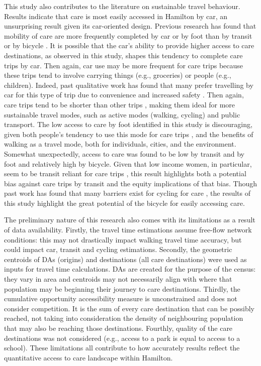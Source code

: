\documentclass[
  super,
  preprint,
  3p]{elsarticle}
\begin{document}
This study also contributes to the literature on sustainable travel
behaviour. Results indicate that care is most easily accessed in
Hamilton by car, an unsurprising result given its car-oriented design.
Previous research has found that mobility of care are more frequently
completed by car or by foot than by transit or by bicycle
\citep{ravensbergenExploratoryAnalysisMobility2022}. It is possible that
the car's ability to provide higher access to care destinations, as
observed in this study, shapes this tendency to complete care trips by
car. Then again, car use may be more frequent for care trips because
these trips tend to involve carrying things (e.g., groceries) or people
(e.g., children). Indeed, past qualitative work has found that many
prefer travelling by car for this type of trip due to convenience and
increased safety
\citep{maciejewskaHaveChildrenThus2019, carverParentalChauffeursWhat2013}.
Then again, care trips tend to be shorter than other trips
\citep{ravensbergenExploratoryAnalysisMobility2022}, making them ideal
for more sustainable travel modes, such as active modes (walking,
cycling) and public transport. The low access to care by foot identified
in this study is discouraging, given both people's tendency to use this
mode for care trips \citep{ravensbergenExploratoryAnalysisMobility2022},
and the benefits of walking as a travel mode, both for individuals,
cities, and the environment. Somewhat unexpectedly, access to care was
found to be low by transit and by foot and relatively high by bicycle.
Given that low income women, in particular, seem to be transit reliant
for care trips \citep{ravensbergenExploratoryAnalysisMobility2022}, this
result highlights both a potential bias against care trips by transit
and the equity implications of that bias. Though past work has found
that many barriers exist for cycling for care
\citep{ravensbergenVelomobilitiesCareLowcycling2020, ravensbergenFeministGeographiesCycling2019, sersliRidingAloneTogether2020},
the results of this study highlight the great potential of the bicycle
for easily accessing care.

The preliminary nature of this research also comes with its limitations
as a result of data availability. Firstly, the travel time estimations
assume free-flow network conditions: this may not drastically impact
walking travel time accuracy, but could impact car, transit and cycling
estimations. Secondly, the geometric centroids of DAs (origins) and
destinations (all care destinations) were used as inputs for travel time
calculations. DAs are created for the purpose of the census: they vary
in area and centroids may not necessarily align with where that
population may be beginning their journey to care destinations. Thirdly,
the cumulative opportunity accessibility measure is unconstrained and
does not consider competition. It is the sum of every care destination
that can be possibly reached, not taking into consideration the density
of neighbouring population that may also be reaching those destinations.
Fourthly, quality of the care destinations was not considered (e.g.,
access to a park is equal to access to a school). These limitations all
contribute to how accurately results reflect the quantitative access to
care landscape within Hamilton.
\end{document}
